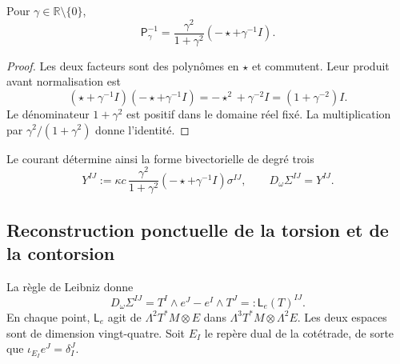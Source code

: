 \begin{lemma}
\label{vii:lem:inversa-holst}
Pour \(\gamma\in\mathbb R\setminus\{0\}\),
\begin{equation}
 \mathsf P_\gamma^{-1}
 =\frac{\gamma^2}{1+\gamma^2}
                      (-\star+\gamma^{-1}I).
 \label{vii:eq:inversa-holst}
\end{equation}
\end{lemma}
\begin{proof}
Les deux facteurs sont des polynômes en \(\star\) et commutent. Leur produit
avant normalisation est
\[
 (\star+\gamma^{-1}I)(-\star+\gamma^{-1}I)
 =-\star^2+\gamma^{-2}I=(1+\gamma^{-2})I.
\]
Le dénominateur \(1+\gamma^2\) est positif dans le domaine réel fixé. La multiplication par \(\gamma^2/(1+\gamma^2)\) donne l'identité.
\end{proof}

Le courant détermine ainsi la forme bivectorielle de degré trois
\begin{equation}
 Y^{IJ}:=\kappa c\,
   \frac{\gamma^2}{1+\gamma^2}
   (-\star+\gamma^{-1}I)\sigma^{IJ},
 \qquad D_\omega\Sigma^{IJ}=Y^{IJ}.
 \label{vii:eq:corriente-dualizada}
\end{equation}

\subsection{Reconstruction ponctuelle de la torsion et de la contorsion}
\label{vii:subsec:reconstruccion-torsion}

La règle de Leibniz donne
\begin{equation}
 D_\omega\Sigma^{IJ}
 =T^I\wedge e^J-e^I\wedge T^J
 =:\mathsf L_e(T)^{IJ}.
 \label{vii:eq:mapa-torsion}
\end{equation}
En chaque point, \(\mathsf L_e\) agit de \(\Lambda^2T^*M\otimes E\) dans \(\Lambda^3T^*M\otimes\Lambda^2E\). Les deux espaces sont de dimension vingt-quatre. Soit \(E_I\) le repère dual de la cotétrade, de sorte que \(\iota_{E_I}e^J=\delta_I^J\).


